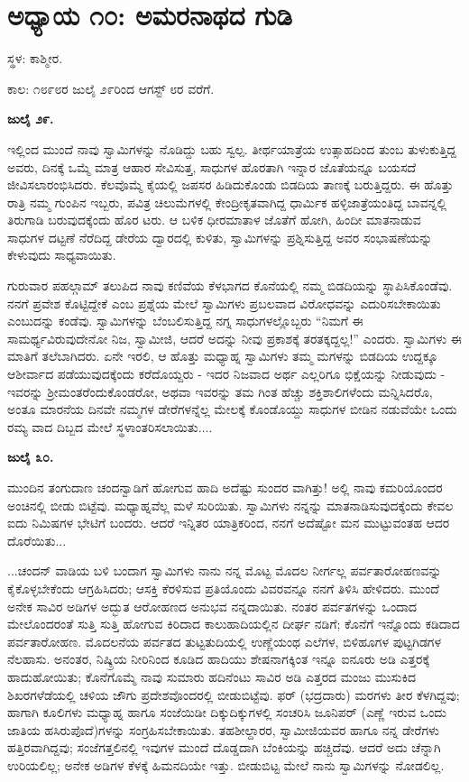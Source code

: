 
\chapter{ಅಧ್ಯಾಯ ೧೦: ಅಮರನಾಥದ ಗುಡಿ}

ಸ್ಥಳ: ಕಾಶ್ಮೀರ.

ಕಾಲ: ೧೮೯೮ರ ಜುಲೈ ೨೯ರಿಂದ ಆಗಸ್ಟ್ ೮ರ ವರೆಗೆ.

\textbf{ಜುಲೈ ೨೯.}

ಇಲ್ಲಿಂದ ಮುಂದೆ ನಾವು ಸ್ವಾಮಿಗಳನ್ನು ನೊಡಿದ್ದು ಬಹು ಸ್ವಲ್ಪ. ತೀರ್ಥಯಾತ್ರೆಯ ಉತ್ಸಾಹದಿಂದ ತುಂಬ ತುಳುಕುತ್ತಿದ್ದ ಅವರು, ದಿನಕ್ಕೆ ಒಮ್ಮೆ ಮಾತ್ರ ಆಹಾರ ಸೇವಿಸುತ್ತ, ಸಾಧುಗಳ ಹೊರತಾಗಿ ಇನ್ನಾರ ಜೊತೆಯನ್ನೂ ಬಯಸದೆ ಜೀವಿಸಲಾರಂಭಿಸಿದರು. ಕೆಲವೊಮ್ಮೆ ಕೈಯಲ್ಲಿ ಜಪಸರ ಹಿಡಿದುಕೊಂಡು ಬಿಡದಿಯ ತಾಣಕ್ಕೆ ಬರುತ್ತಿದ್ದರು. ಈ ಹೊತ್ತು ರಾತ್ರಿ ನಮ್ಮ ಗುಂಪಿನ ಇಬ್ಬರು, ಪವಿತ್ರ ಚಿಲುಮೆಗಳಲ್ಲಿ ಕೇಂದ್ರೀಕೃತವಾಗಿದ್ದ ಧಾರ್ಮಿಕ ಹಳ್ಳಿಜಾತ್ರೆಯಂತಿದ್ದ ಬಾವನ್ನಲ್ಲಿ ತಿರುಗಾಡಿ ಬರುವುದಕ್ಕೆಂದು ಹೊರ ಟರು. ಆ ಬಳಿಕ ಧೀರಮಾತಾಳ ಜೊತೆಗೆ ಹೋಗಿ, ಹಿಂದೀ ಮಾತನಾಡುವ ಸಾಧುಗಳ ದಟ್ಟಣೆ ನೆರೆದಿದ್ದ ಡೇರೆಯ ದ್ವಾರದಲ್ಲಿ ಕುಳಿತು, ಸ್ವಾಮಿಗಳನ್ನು ಪ್ರಶ್ನಿಸುತ್ತಿದ್ದ ಅವರ ಸಂಭಾಷಣೆಯನ್ನು ಕೇಳುವುದು ಸಾಧ್ಯವಾಯಿತು.

ಗುರುವಾರ ಪಹಲ್ಗಾಮ್​ ತಲುಪಿದ ನಾವು ಕಣಿವೆಯ ಕೆಳಭಾಗದ ಕೊನೆಯಲ್ಲಿ ನಮ್ಮ ಬಿಡದಿಯನ್ನು ಸ್ಥಾಪಿಸಿಕೊಂಡೆವು. ನನಗೆ ಪ್ರವೇಶ ಕೊಟ್ಟಿದ್ದೇಕೆ ಎಂಬ ಪ್ರಶ್ನೆಯ ಮೇಲೆ ಸ್ವಾಮಿಗಳು ಪ್ರಬಲವಾದ ವಿರೋಧವನ್ನು ಎದುರಿಸಬೇಕಾಯಿತು ಎಂಬುದನ್ನು ಕಂಡೆವು. ಸ್ವಾಮಿಗಳನ್ನು ಬೆಂಬಲಿಸುತ್ತಿದ್ದ ನಗ್ನ ಸಾಧುಗಳಲ್ಲೊಬ್ಬರು “ನಿಮಗೆ ಈ ಸಾಮರ್ಥ್ಯವಿರುವುದೇನೋ ನಿಜ, ಸ್ವಾಮೀಜಿ, ಆದರೆ ಅದನ್ನು ನೀವು ಪ್ರಕಾಶಕ್ಕೆ ತರತಕ್ಕದ್ದಲ್ಲ!” ಎಂದರು. ಸ್ವಾಮಿಗಳು ಈ ಮಾತಿಗೆ ತಲೆಬಾಗಿದರು. ಏನೇ ಇರಲಿ, ಆ ಹೊತ್ತು ಮಧ್ಯಾಹ್ನ ಸ್ವಾಮಿಗಳು ತಮ್ಮ ಮಗಳನ್ನು ಬಿಡದಿಯ ಉದ್ದಕ್ಕೂ ಆಶೀರ್ವಾದ ಪಡೆಯುವುದಕ್ಕೆಂದು ಕರೆದೊಯ್ದರು - ಇದರ ನಿಜವಾದ ಅರ್ಥ ಎಲ್ಲರಿಗೂ ಭಿಕ್ಷೆಯನ್ನು ನೀಡುವುದು - ಇವರನ್ನು ಶ‍್ರೀಮಂತರೆಂದುಕೊಂಡರೋ, ಅಥವಾ ಇವರನ್ನು ತಮ ಗಿಂತ ಹೆಚ್ಚು ಶಕ್ತಿಶಾಲಿಗಳೆಂದು ಮನ್ನಿಸಿದರೊ, ಅಂತೂ ಮಾರನೆಯ ದಿನವೇ ನಮ್ಮಗಳ ಡೇರೆಗಳನ್ನೆಲ್ಲ ಮೇಲಕ್ಕೆ ಕೊಂಡೊಯ್ದು ಸಾಧುಗಳ ಬೀಡಿನ ನಡುವೆಯೇ ಒಂದು ರಮ್ಯ ವಾದ ದಿಬ್ಬದ ಮೇಲೆ ಸ್ಥಳಾಂತರಿಸಲಾಯಿತು....

\textbf{ಜುಲೈ ೩೦.}

ಮುಂದಿನ ತಂಗುದಾಣ ಚಂದನ್ವಾಡಿಗೆ ಹೋಗುವ ಹಾದಿ ಅದೆಷ್ಟು ಸುಂದರ ವಾಗಿತ್ತು! ಅಲ್ಲಿ ನಾವು ಕಮರಿಯೊಂದರ ಅಂಚಿನಲ್ಲಿ ಬೀಡು ಬಿಟ್ಟೆವು. ಮಧ್ಯಾಹ್ನವೆಲ್ಲ ಮಳೆ ಸುರಿಯಿತು. ಸ್ವಾಮಿಗಳು ನನ್ನನ್ನು ಮಾತನಾಡಿಸುವುದಕ್ಕೆಂದು ಕೇವಲ ಐದು ನಿಮಿಷಗಳ ಭೇಟಿಗೆ ಬಂದರು. ಆದರೆ ಇನ್ನಿತರ ಯಾತ್ರಿಕರಿಂದ, ನನಗೆ ಅದೆಷ್ಟೋ ಮನ ಮುಟ್ಟುವಂತಹ ಆದರ ದೊರೆಯಿತು...

...ಚಂದನ್ ವಾಡಿಯ ಬಳಿ ಬಂದಾಗ ಸ್ವಾಮಿಗಳು ನಾನು ನನ್ನ ಮೊಟ್ಟ ಮೊದಲ ನೀರ್ಗಲ್ಲ ಪರ್ವತಾರೋಹಣವನ್ನು ಕೈಕೊಳ್ಳಬೇಕೆಂದು ಆಗ್ರಹಿಸಿದರು; ಆಸಕ್ತಿ ಕೆರಳಿಸುವ ಪ್ರತಿಯೊಂದು ವಿವರವನ್ನೂ ನನಗೆ ತಿಳಿಸಿ ಹೇಳಿದರು. ಮುಂದೆ ಅನೇಕ ಸಾವಿರ ಅಡಿಗಳ ಅದ್ಭುತ ಆರೋಹಣದ ಅನುಭವ ನನ್ನದಾಯಿತು. ನಂತರ ಪರ್ವತಗಳನ್ನು ಒಂದಾದ ಮೇಲೊಂದರಂತೆ ಸುತ್ತಿ ಸುತ್ತಿ ಹೋಗುವ ಕಿರಿದಾದ ಕಾಲುಹಾದಿಯಲ್ಲಿನ ದೀರ್ಘ ನಡಿಗೆ; ಕೊನೆಗೆ ಇನ್ನೊಂದು ಕಡಿದಾದ ಪರ್ವತಾರೋಹಣ. ಮೊದಲನೆಯ ಪರ್ವತದ ತುಟ್ಟತುದಿಯಲ್ಲಿ ಉಣ್ಣೆಯಂಥ ಎಲೆಗಳ, ಬಿಳಿಹೂಗಳ ಪುಟ್ಟಗಿಡಗಳ ನೆಲಹಾಸು. ಅನಂತರ, ನಿಷ್ಕ್ರಿಯ ನೀರಿನಿಂದ ಕೂಡಿದ ಹಾದಿಯು ಶೇಷನಾಗಕ್ಕಿಂತ ಇನ್ನೂ ಐನೂರು ಅಡಿ ಎತ್ತರಕ್ಕೆ ಹಾದುಹೋಯಿತು; ಕೊನೆಗೊಮ್ಮೆ ನಾವು ಸುಮಾರು ಹದಿನೆಂಟು ಸಾವಿರ ಅಡಿ ಎತ್ತರದ ಮಂಜು ಮುಸುಕಿದ ಶಿಖರಗಳೆಡೆಯಲ್ಲಿ ಚಳಿಯ ಜೌಗು ಪ್ರದೇಶವೊಂದರಲ್ಲಿ ಬೀಡುಬಿಟ್ಟೆವು. ಫರ್ (ಭದ್ರದಾರು) ಮರಗಳು ತೀರ ಕೆಳಗಿದ್ದವು; ಹಾಗಾಗಿ ಕೂಲಿಗಳು ಮಧ್ಯಾಹ್ನ ಹಾಗೂ ಸಂಜೆಯಿಡೀ ದಿಕ್ಕುದಿಕ್ಕುಗಳಲ್ಲಿ ಸಂಚರಿಸಿ ಜೂನಿಪರ್ (ಎಣ್ಣೆ ಇರುವ ಒಂದು ಜಾತಿಯ ಹಸಿರುಪೊದೆ)ಗಳನ್ನು ಸಂಗ್ರಹಿಸಬೇಕಾಯಿತು. ತಹಶೀಲ್ದಾರರ, ಸ್ವಾಮೀಜಿಯವರ ಹಾಗೂ ನನ್ನ ಡೇರೆಗಳು ಹತ್ತಿರವಾಗಿದ್ದವು; ಸಂಜೆಗತ್ತಲಿನಲ್ಲಿ ಇವುಗಳ ಮುಂದೆ ದೊಡ್ಡದಾಗಿ ಬೆಂಕಿಯನ್ನು ಹಚ್ಚಿದೆವು. ಆದರೆ ಅದು ಚೆನ್ನಾಗಿ ಉರಿಯಲಿಲ್ಲ; ಅನೇಕ ಅಡಿಗಳ ಕೆಳಕ್ಕೆ ಹಿಮನದಿಯೇ ಇತ್ತು. ಬೀಡುಬಿಟ್ಟ ಮೇಲೆ ನಾನು ಸ್ವಾಮಿಗಳನ್ನು ನೋಡಲಿಲ್ಲ.


